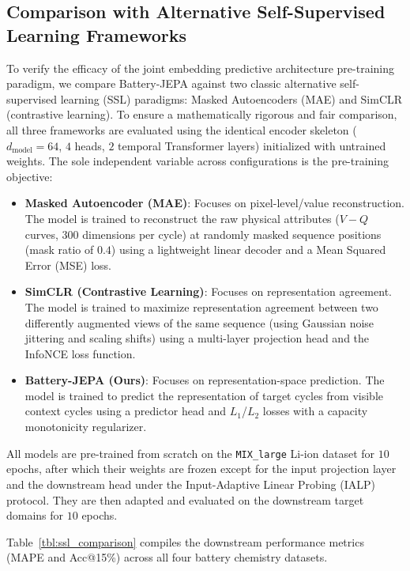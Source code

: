 \documentclass[a4paper,fleqn]{cas-dc}
\begin{document}
\subsection{Comparison with Alternative Self-Supervised Learning Frameworks}
To verify the efficacy of the joint embedding predictive architecture pre-training paradigm, we compare Battery-JEPA against two classic alternative self-supervised learning (SSL) paradigms: Masked Autoencoders (MAE) and SimCLR (contrastive learning). To ensure a mathematically rigorous and fair comparison, all three frameworks are evaluated using the identical encoder skeleton ($d_{\text{model}}=64$, $4$ heads, $2$ temporal Transformer layers) initialized with untrained weights. The sole independent variable across configurations is the pre-training objective:
\begin{itemize}
    \item \textbf{Masked Autoencoder (MAE)}: Focuses on pixel-level/value reconstruction. The model is trained to reconstruct the raw physical attributes ($V-Q$ curves, 300 dimensions per cycle) at randomly masked sequence positions (mask ratio of $0.4$) using a lightweight linear decoder and a Mean Squared Error (MSE) loss.
    \item \textbf{SimCLR (Contrastive Learning)}: Focuses on representation agreement. The model is trained to maximize representation agreement between two differently augmented views of the same sequence (using Gaussian noise jittering and scaling shifts) using a multi-layer projection head and the InfoNCE loss function.
    \item \textbf{Battery-JEPA (Ours)}: Focuses on representation-space prediction. The model is trained to predict the representation of target cycles from visible context cycles using a predictor head and $L_1$/$L_2$ losses with a capacity monotonicity regularizer.
\end{itemize}
All models are pre-trained from scratch on the \texttt{MIX\_large} Li-ion dataset for $10$ epochs, after which their weights are frozen except for the input projection layer and the downstream head under the Input-Adaptive Linear Probing (IALP) protocol. They are then adapted and evaluated on the downstream target domains for $10$ epochs.

Table~\ref{tbl:ssl_comparison} compiles the downstream performance metrics (MAPE and Acc@15\%) across all four battery chemistry datasets. 
\end{document}
